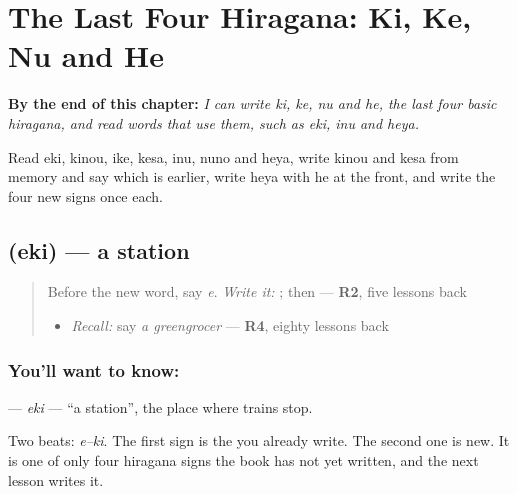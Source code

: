 
\chapter{The Last Four Hiragana: Ki, Ke, Nu and He}
\label{ch:ja-last-four-hiragana-ki-ke-nu-he}

\begin{chapteropening}
\textbf{By the end of this chapter:} \emph{I can write ki, ke, nu and he, the last four basic hiragana, and read words that use them, such as eki, inu and heya.}

Read eki, kinou, ike, kesa, inu, nuno and heya, write kinou and kesa from memory and say which is earlier, write heya with he at the front, and write the four new signs once each.
\end{chapteropening}

\section[\texorpdfstring{\ja{えき} (eki)}{えき (eki)}]{ (eki) — a station}

\label{lesson:JA-C133-eki}



\begin{quote}
Before the new word, say \emph{e}. \emph{Write it:} \textbf{}; then \textbf{} — \textbf{R2}, five lessons back

\begin{itemize}
\raggedright
  \item \emph{Recall:} say \emph{a greengrocer} — \textbf{R4}, eighty lessons back
\end{itemize}
\end{quote}

\subsection*{You'll want to know: }
\textbf{} — \emph{eki} — \textquotedblleft{}a station\textquotedblright{}, the place where trains stop.

Two beats: \emph{e–ki}. The first sign is the \textbf{} you already write. The second one is new. It is one of only four hiragana signs the book has not yet written, and the next lesson writes it.

